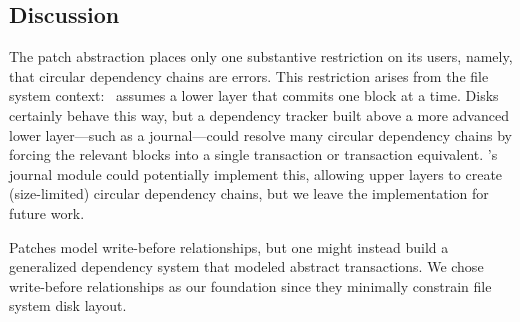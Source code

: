 


\subsection{Discussion}

The patch abstraction places only one substantive restriction on its users,
 namely, that circular dependency chains are errors.
%
This restriction arises from the file system context: \Kudos\ assumes a
 lower layer that commits one block at a time.
%
Disks certainly behave this way, but a dependency tracker built above a
 more advanced lower layer---such as a journal---could resolve many
 circular dependency chains by forcing the relevant blocks into a single
 transaction or transaction equivalent.
%
\Featherstitch's journal module could potentially implement this, allowing
 upper layers to create (size-limited) circular dependency chains, but we
 leave the implementation for future work.

Patches model write-before relationships, but one might instead build a
 generalized dependency system that modeled abstract
 transactions.
%
We chose write-before relationships as our foundation since they minimally
 constrain file system disk layout.
